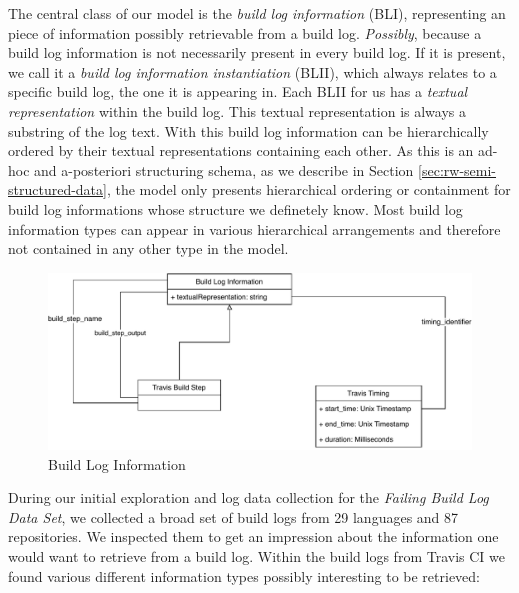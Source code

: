 \documentclass[\myrootdir/main.tex]{subfiles}
\begin{document}
The central class of our model is the \emph{build log information} (BLI), representing an piece of information possibly retrievable from a build log.
\emph{Possibly}, because a build log information is not necessarily present in every build log.
If it is present, we call it a \emph{build log information instantiation} (BLII), which always relates to a specific build log, the one it is appearing in.
Each BLII for us has a \emph{textual representation} within the build log.
This textual representation is always a substring of the log text.
With this build log information  can be hierarchically ordered by their textual representations containing each other.
As this is an ad-hoc and a-posteriori structuring schema, as we describe in Section \ref{sec:rw-semi-structured-data}, the model only presents hierarchical ordering or containment for build log informations whose structure we definetely know.
Most build log information types can appear in various hierarchical arrangements and therefore not contained in any other type in the model.

\begin{figure}[h]
	\centering
	\includegraphics[width=\textwidth]{img/mt-graphics-BuildLogInformation.pdf}
	\caption{Build Log Information}
	\label{fig:build-log-information}
\end{figure}
During our initial exploration and log data collection for the \emph{Failing Build Log Data Set}, we collected a broad set of build logs from 29 languages and 87 repositories. We inspected them to get an impression about the information one would want to retrieve from a build log. Within the build logs from Travis CI we found various different information types possibly interesting to be retrieved:
\end{document}
